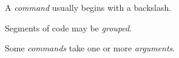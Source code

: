 \documentclass[12pt]{scrartcl}
\newcommand*{\keyword}[1]{\textsf{\slshape\color{blue} #1}}
\begin{document}
A \keyword{command} usually begins with a backslash.

Segments of code may be \keyword{grouped}.

Some \keyword{commands} take one or more \keyword{arguments}.
\end{document}
